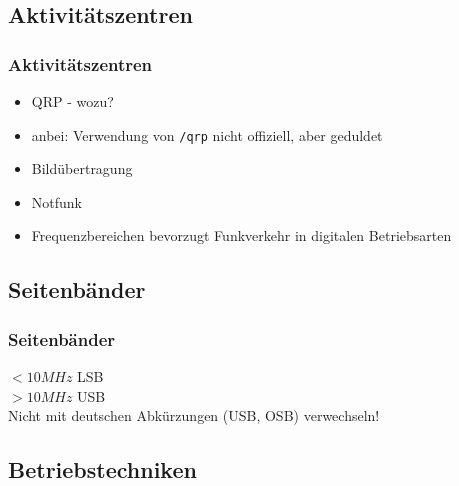 
\subsection{Aktivitätszentren}

\begin{frame}
    \frametitle{Aktivitätszentren}

    \begin{itemize}[<+->]
        \item QRP - wozu?
        \item anbei: Verwendung von \texttt{/qrp} nicht offiziell, aber geduldet
        \item Bildübertragung
        \item Notfunk
        \item Frequenzbereichen bevorzugt Funkverkehr in digitalen Betriebsarten 
    \end{itemize}

\end{frame}

\subsection{Seitenbänder}

\begin{frame}
    \frametitle{Seitenbänder}

    $<10 MHz$ LSB \\[1em]
    $>10 MHz$ USB \\[3em]

    Nicht mit deutschen Abkürzungen (USB, OSB) verwechseln!

\end{frame}

\subsection{Betriebstechniken}

